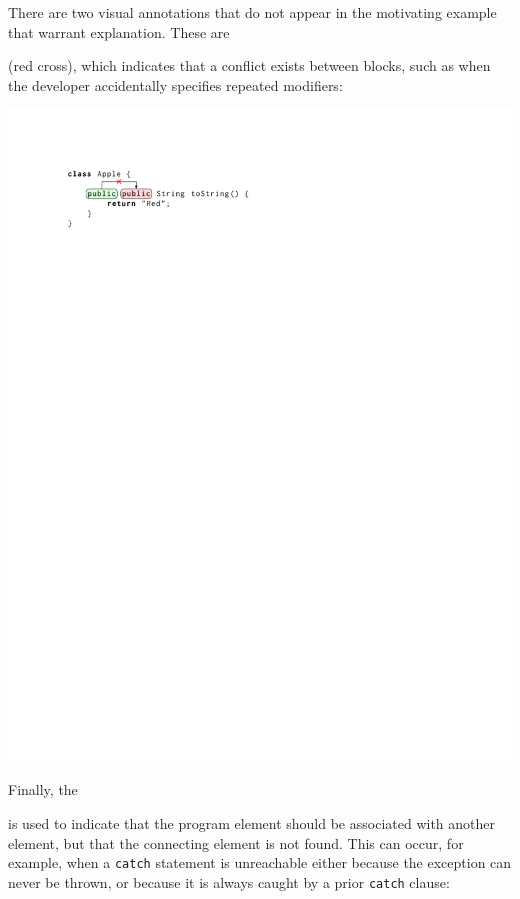 \documentclass[conference]{IEEEtran}
\begin{document}
There are two visual annotations that do not appear in the motivating example that warrant explanation. These are  (red cross), which indicates that a conflict exists between blocks, such as when the developer accidentally specifies repeated modifiers:

\includegraphics{apple_explain_crop.pdf}

Finally, the  is used to indicate that the program element should be associated with another element, but that the connecting element is not found. This can occur, for example, when a \texttt{catch} statement is unreachable either because the exception can never be thrown, or because it is always caught by a prior \texttt{catch} clause:
\end{document}

